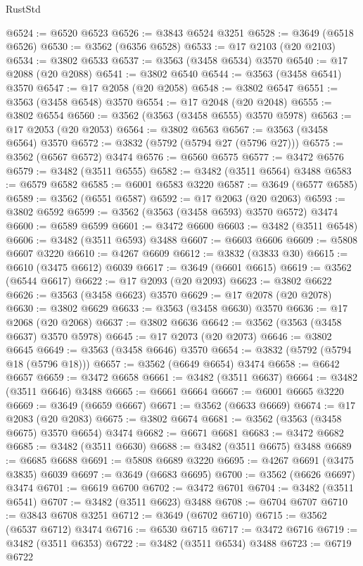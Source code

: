 \begin{lexlean}{RustStd}
\begin{coremodule}
@6524 := @6520 @6523
@6526 := @3843 @6524 @3251
@6528 := @3649 (@6518 @6526)
@6530 := @3562 (@6356 @6528)
@6533 := @17 @2103 (@20 @2103)
@6534 := @3802 @6533
@6537 := @3563 (@3458 @6534) @3570
@6540 := @17 @2088 (@20 @2088)
@6541 := @3802 @6540
@6544 := @3563 (@3458 @6541) @3570
@6547 := @17 @2058 (@20 @2058)
@6548 := @3802 @6547
@6551 := @3563 (@3458 @6548) @3570
@6554 := @17 @2048 (@20 @2048)
@6555 := @3802 @6554
@6560 := @3562 (@3563 (@3458 @6555) @3570 @5978)
@6563 := @17 @2053 (@20 @2053)
@6564 := @3802 @6563
@6567 := @3563 (@3458 @6564) @3570
@6572 := @3832 (@5792 (@5794 @27 (@5796 @27)))
@6575 := @3562 (@6567 @6572) @3474
@6576 := @6560 @6575
@6577 := @3472 @6576
@6579 := @3482 (@3511 @6555)
@6582 := @3482 (@3511 @6564) @3488
@6583 := @6579 @6582
@6585 := @6001 @6583 @3220
@6587 := @3649 (@6577 @6585)
@6589 := @3562 (@6551 @6587)
@6592 := @17 @2063 (@20 @2063)
@6593 := @3802 @6592
@6599 := @3562 (@3563 (@3458 @6593) @3570 @6572) @3474
@6600 := @6589 @6599
@6601 := @3472 @6600
@6603 := @3482 (@3511 @6548)
@6606 := @3482 (@3511 @6593) @3488
@6607 := @6603 @6606
@6609 := @5808 @6607 @3220
@6610 := @4267 @6609
@6612 := @3832 (@3833 @30)
@6615 := @6610 (@3475 @6612) @6039
@6617 := @3649 (@6601 @6615)
@6619 := @3562 (@6544 @6617)
@6622 := @17 @2093 (@20 @2093)
@6623 := @3802 @6622
@6626 := @3563 (@3458 @6623) @3570
@6629 := @17 @2078 (@20 @2078)
@6630 := @3802 @6629
@6633 := @3563 (@3458 @6630) @3570
@6636 := @17 @2068 (@20 @2068)
@6637 := @3802 @6636
@6642 := @3562 (@3563 (@3458 @6637) @3570 @5978)
@6645 := @17 @2073 (@20 @2073)
@6646 := @3802 @6645
@6649 := @3563 (@3458 @6646) @3570
@6654 := @3832 (@5792 (@5794 @18 (@5796 @18)))
@6657 := @3562 (@6649 @6654) @3474
@6658 := @6642 @6657
@6659 := @3472 @6658
@6661 := @3482 (@3511 @6637)
@6664 := @3482 (@3511 @6646) @3488
@6665 := @6661 @6664
@6667 := @6001 @6665 @3220
@6669 := @3649 (@6659 @6667)
@6671 := @3562 (@6633 @6669)
@6674 := @17 @2083 (@20 @2083)
@6675 := @3802 @6674
@6681 := @3562 (@3563 (@3458 @6675) @3570 @6654) @3474
@6682 := @6671 @6681
@6683 := @3472 @6682
@6685 := @3482 (@3511 @6630)
@6688 := @3482 (@3511 @6675) @3488
@6689 := @6685 @6688
@6691 := @5808 @6689 @3220
@6695 := @4267 @6691 (@3475 @3835) @6039
@6697 := @3649 (@6683 @6695)
@6700 := @3562 (@6626 @6697) @3474
@6701 := @6619 @6700
@6702 := @3472 @6701
@6704 := @3482 (@3511 @6541)
@6707 := @3482 (@3511 @6623) @3488
@6708 := @6704 @6707
@6710 := @3843 @6708 @3251
@6712 := @3649 (@6702 @6710)
@6715 := @3562 (@6537 @6712) @3474
@6716 := @6530 @6715
@6717 := @3472 @6716
@6719 := @3482 (@3511 @6353)
@6722 := @3482 (@3511 @6534) @3488
@6723 := @6719 @6722

\end{coremodule}
\end{lexlean}
